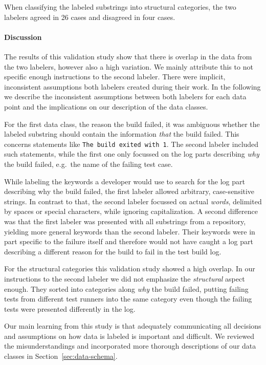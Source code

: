 \documentclass[\myrootdir/main.tex]{subfiles}
\begin{document}
When classifying the labeled substrings into structural categories, the two labelers agreed in 26 cases and disagreed in four cases.

\paragraph{Discussion}
The results of this validation study show that there is overlap in the data from the two labelers, however also a high variation.
We mainly attribute this to not specific enough instructions to the second labeler.
There were implicit, inconsistent assumptions both labelers created during their work.
In the following we describe the inconsistent assumptions between both labelers for each data point and the implications on our description of the data classes.

For the first data class, the reason the build failed, it was ambiguous whether the labeled substring should contain the information \emph{that} the build failed.
This concerns statements like \texttt{The build exited with 1}.
The second labeler included such statements, while the first one only focussed on the log parts describing \emph{why} the build failed, e.g.\ the name of the failing test case.

While labeling the keywords a developer would use to search for the log part describing why the build failed, the first labeler allowed arbitrary, case-sensitive strings.
In contrast to that, the second labeler focussed on actual \emph{words}, delimited by spaces or special characters, while ignoring capitalization.
A second difference was that the first labeler was presented with all substrings from a repository, yielding more general keywords than the second labeler.
Their keywords were in part specific to the failure itself and therefore would not have caught a log part describing a different reason for the build to fail in the test build log.

For the structural categories this validation study showed a high overlap.
In our instructions to the second labeler we did not emphasize the \emph{structural} aspect enough.
They sorted into categories along \emph{why} the build failed, putting failing tests from different test runners into the same category even though the failing tests were presented differently in the log.


Our main learning from this study is that adequately communicating all decisions and assumptions on how data is labeled is important and difficult.
We reviewed the misunderstandings and incorporated more thorough descriptions of our data classes in Section~\ref{sec:data-schema}.
\end{document}
